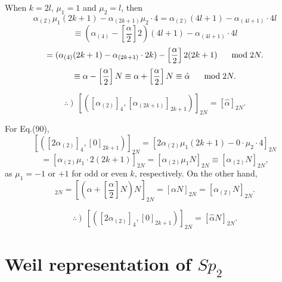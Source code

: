 \documentclass[12pt]{iopart}
\begin{document}
\noindent
When \(k=2l\), \(\mu_1=1\) and \(\mu_2=l\), then
\[
\alpha_{(2)}\mu_1(2k+1)-\alpha_{(2k+1)}\mu_2\cdot4
=
\alpha_{(2)}(4l+1)-\alpha_{(4l+1)}\cdot4l
\]
\[
\equiv
(\alpha_{(4)}-\left[\frac\alpha2\right]2)(4l+1)-\alpha_{(4l+1)}\cdot4l
\]
\[
=
(\alpha_{(4)}(2k+1)-\alpha_{(2k+1)}\cdot2k)
-\left[\frac\alpha2\right]2(2k+1)
\hspace{5mm}\bmod2N.
\]
\begin{equation}
\equiv
\alpha-\left[\frac\alpha2\right]N
\equiv
\alpha+\left[\frac\alpha2\right]N
\equiv
\hat\alpha
\hspace{5mm}\bmod2N.
\end{equation}

\begin{equation}
\therefore\ )\ \ 
[([\alpha_{(2)}]_4,[\alpha_{(2k+1)}]_{2k+1})]_{2N}
=
[\hat\alpha]_{2N}.
\end{equation}

For Eq.(90),
\[
[([2\alpha_{(2)}]_4,[0]_{2k+1})]_{2N}
=
[2\alpha_{(2)}\mu_1(2k+1)-0\cdot\mu_2\cdot4]_{2N}
\]
\begin{equation}
=
[\alpha_{(2)}\mu_1\cdot2(2k+1)]_{2N}
=
[\alpha_{(2)}\mu_1N]_{2N}
\equiv
[\alpha_{(2)}N]_{2N},
\end{equation}
as \(\mu_1=-1\) or \(+1\) for odd or even \(k\), respectively.
On the other hand,
\begin{equation}
[\hat\alpha N]_{2N}
=
\left[\left(\alpha+\left[\frac\alpha2\right]N\right)N\right]_{2N}
=
\left[\alpha N\right]_{2N}
=
\left[\alpha_{(2)}N\right]_{2N}.
\end{equation}

\begin{equation}
\therefore\ )\ \ 
[([2\alpha_{(2)}]_4,[0]_{2k+1})]_{2N}
=
[\hat\alpha N]_{2N}.
\end{equation}

\newpage

\section{Weil representation of \(Sp_2\)}
\end{document}
